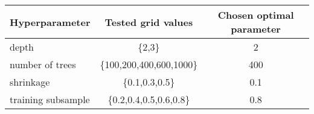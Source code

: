 \begin{tabular}{l|c|c|}
    Hyperparameter     & Tested grid values       & Chosen optimal parameter \\
    \hline 
    depth              & \{2,3\}                  & 2    \\
    number of trees    & \{100,200,400,600,1000\} & 400  \\
    shrinkage          & \{0.1,0.3,0.5\}          & 0.1  \\
    training subsample & \{0.2,0.4,0.5,0.6,0.8\}  & 0.8  \\
\end{tabular}
